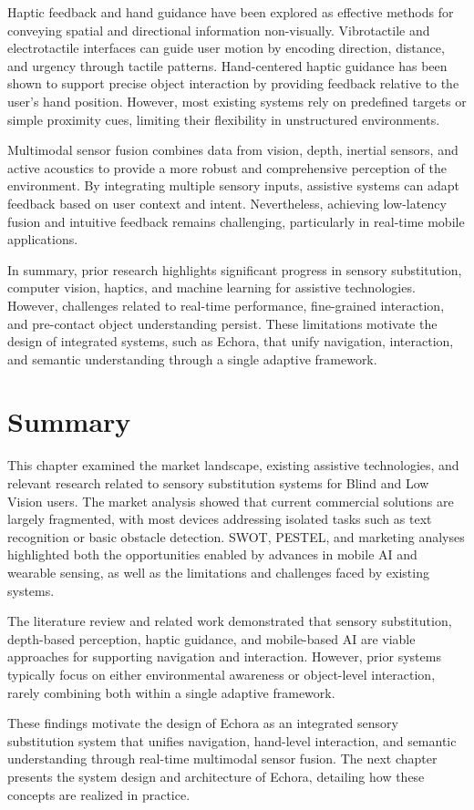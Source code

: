 Haptic feedback and hand guidance have been explored as effective methods for conveying spatial and directional information non-visually. Vibrotactile and electrotactile interfaces can guide user motion by encoding direction, distance, and urgency through tactile patterns. Hand-centered haptic guidance has been shown to support precise object interaction by providing feedback relative to the user’s hand position. However, most existing systems rely on predefined targets or simple proximity cues, limiting their flexibility in unstructured environments.

Multimodal sensor fusion combines data from vision, depth, inertial sensors, and active acoustics to provide a more robust and comprehensive perception of the environment. By integrating multiple sensory inputs, assistive systems can adapt feedback based on user context and intent. Nevertheless, achieving low-latency fusion and intuitive feedback remains challenging, particularly in real-time mobile applications.

In summary, prior research highlights significant progress in sensory substitution, computer vision, haptics, and machine learning for assistive technologies. However, challenges related to real-time performance, fine-grained interaction, and pre-contact object understanding persist. These limitations motivate the design of integrated systems, such as Echora, that unify navigation, interaction, and semantic understanding through a single adaptive framework.


\section{Summary}

This chapter examined the market landscape, existing assistive technologies, and relevant research related to sensory substitution systems for Blind and Low Vision users. The market analysis showed that current commercial solutions are largely fragmented, with most devices addressing isolated tasks such as text recognition or basic obstacle detection. SWOT, PESTEL, and marketing analyses highlighted both the opportunities enabled by advances in mobile AI and wearable sensing, as well as the limitations and challenges faced by existing systems.

The literature review and related work demonstrated that sensory substitution, depth-based perception, haptic guidance, and mobile-based AI are viable approaches for supporting navigation and interaction. However, prior systems typically focus on either environmental awareness or object-level interaction, rarely combining both within a single adaptive framework.

These findings motivate the design of Echora as an integrated sensory substitution system that unifies navigation, hand-level interaction, and semantic understanding through real-time multimodal sensor fusion. The next chapter presents the system design and architecture of Echora, detailing how these concepts are realized in practice.
